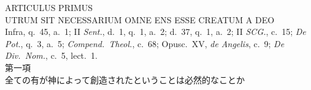 \documentclass[paper=a4paper,fontsize=10pt,jafontsize=9pt,titlepage]{jlreq}
\begin{document}
\newpage
{}
{}
\setcounter{section}{1}
\setcounter{subsection}{0}

\begin{center}
{\Large ARTICULUS PRIMUS}\\
{\large UTRUM SIT NECESSARIUM OMNE ENS ESSE CREATUM A DEO}\\
{\footnotesize Infra, q.~45, a.~1; II {\itshape Sent.}, d.~1, q.~1,
 a.~2; d.~37, q.~1, a.~2; II {\itshape SCG.}, c.~15; {\itshape De Pot.},
 q.~3, a.~5; {\itshape Compend.~Theol.}, c.~68; Opusc.~XV, {\itshape de
 Angelis}, c.~9; {\itshape De Div.~Nom.}, c.~5, lect.~1.}\\
{\large 第一項\\全ての有が神によって創造されたということは必然的なことか}
\end{center}
\end{document}
